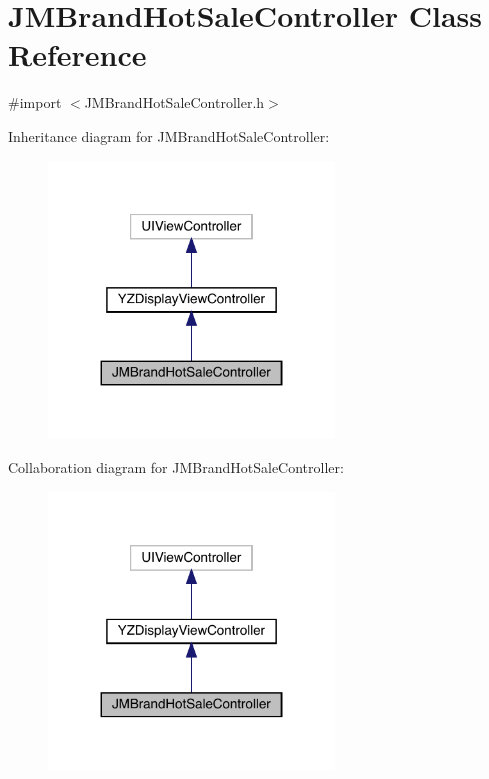 \hypertarget{interface_j_m_brand_hot_sale_controller}{}\section{J\+M\+Brand\+Hot\+Sale\+Controller Class Reference}
\label{interface_j_m_brand_hot_sale_controller}


{\ttfamily \#import $<$J\+M\+Brand\+Hot\+Sale\+Controller.\+h$>$}



Inheritance diagram for J\+M\+Brand\+Hot\+Sale\+Controller\+:\nopagebreak
\begin{figure}[H]
\begin{center}
\leavevmode
\includegraphics[width=215pt]{interface_j_m_brand_hot_sale_controller__inherit__graph}
\end{center}
\end{figure}


Collaboration diagram for J\+M\+Brand\+Hot\+Sale\+Controller\+:\nopagebreak
\begin{figure}[H]
\begin{center}
\leavevmode
\includegraphics[width=215pt]{interface_j_m_brand_hot_sale_controller__coll__graph}
\end{center}
\end{figure}
